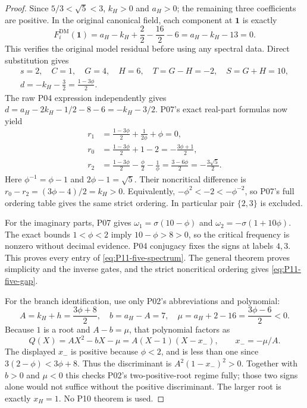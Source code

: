 \documentclass[11pt]{article}
\newcommand{\one}{\mathbf{1}}
\newcommand{\DM}{\mathrm{DM}}
\theoremstyle{definition}
\theoremstyle{remark}
\begin{document}
\begin{proof}
Since $5/3<\sqrt5<3$, $k_H>0$ and $a_H>0$;
the remaining three coefficients are positive. In the original
canonical field, each component at $\one$ is exactly
\[
 F_i^{\DM}(\one)=a_H-k_H+\frac22-\frac{16}2-6
     =a_H-k_H-13=0.
\]
This verifies the original model residual before using any spectral data.
Direct substitution gives
\begin{equation}
 \begin{gathered}
 s=2,\quad C=1,\quad G=4,\quad H=6,\quad T=G-H=-2,\quad S=G+H=10,\\
 d=-k_H-\frac32=\frac{1-3\phi}{2}.
 \end{gathered}
 \label{eq:P11-five-effective}
\end{equation}
The raw P04 expression independently gives
$d=a_H-2k_H-1/2-8-6=-k_H-3/2$.
P07's exact real-part formulas now yield
\begin{align*}
 r_1&=\frac{1-3\phi}{2}+\frac{1}{2\phi}+\phi=0,\\
 r_0&=\frac{1-3\phi}{2}+1-2=-\frac{3\phi+1}{2},\\
 r_2&=\frac{1-3\phi}{2}-\frac\phi2-\frac1\phi
       =\frac{3-6\phi}{2}=-\frac{3\sqrt5}{2}.
\end{align*}
Here $\phi^{-1}=\phi-1$ and $2\phi-1=\sqrt5$.
Their noncritical difference is
$r_0-r_2=(3\phi-4)/2=k_H>0$. Equivalently,
$-\phi^2<-2<-\phi^{-2}$, so P07's full ordering table gives
the same strict ordering. In particular pair $\{2,3\}$ is excluded.

For the imaginary parts, P07 gives
$\omega_1=\sigma(10-\phi)$ and
$\omega_2=-\sigma(1+10\phi)$. The exact bounds $1<\phi<2$
imply $10-\phi>8>0$, so the critical frequency is nonzero without
decimal evidence. P04 conjugacy fixes the signs at labels $4,3$.
This proves every entry of \eqref{eq:P11-five-spectrum}.
The general theorem proves simplicity and the inverse gates, and the
strict noncritical ordering gives \eqref{eq:P11-five-gap}.

For the branch identification, use only P02's abbreviations and polynomial:
\begin{equation}
 A=k_H+h=\frac{3\phi+8}{2},\quad b=a_H-A=7,\quad
 \mu=a_H+2-16=\frac{3\phi-6}{2}<0.
 \label{eq:P11-branch-data}
\end{equation}
Because $1$ is a root and $A-b=\mu$, that polynomial factors as
\[
 Q(X)=AX^2-bX-\mu=A(X-1)(X-x_-),\qquad x_-=-\mu/A.
\]
The displayed $x_-$ is positive because $\phi<2$, and is less than
one since $3(2-\phi)<3\phi+8$. Thus the discriminant is
$A^2(1-x_-)^2>0$. Together with $b>0$ and $\mu<0$ this checks
P02's two-positive-root regime fully; those two signs alone would
not suffice without the positive discriminant. The larger root is
exactly $x_H=1$. No P10 theorem is used.
\end{proof}
\end{document}
